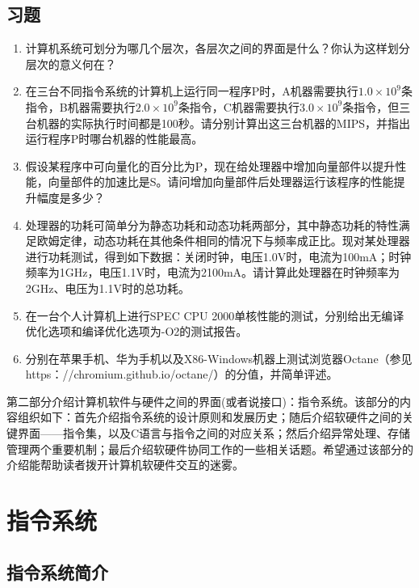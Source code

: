 \documentclass[]{ctexbook}
\begin{document}
\hypertarget{ux4e60ux9898}{%
\section{习题}\label{ux4e60ux9898}}

\begin{enumerate}
\def\labelenumi{\arabic{enumi}.}
\item
  计算机系统可划分为哪几个层次，各层次之间的界面是什么？你认为这样划分层次的意义何在？
\item
  在三台不同指令系统的计算机上运行同一程序P时，A机器需要执行\(1.0\times{}10^9\)条指令，B机器需要执行\(2.0\times{}10^9\)条指令，C机器需要执行\(3.0\times{}10^9\)条指令，但三台机器的实际执行时间都是100秒。请分别计算出这三台机器的MIPS，并指出运行程序P时哪台机器的性能最高。
\item
  假设某程序中可向量化的百分比为P，现在给处理器中增加向量部件以提升性能，向量部件的加速比是S。请问增加向量部件后处理器运行该程序的性能提升幅度是多少？
\item
  处理器的功耗可简单分为静态功耗和动态功耗两部分，其中静态功耗的特性满足欧姆定律，动态功耗在其他条件相同的情况下与频率成正比。现对某处理器进行功耗测试，得到如下数据：关闭时钟，电压1.0V时，电流为100mA；时钟频率为1GHz，电压1.1V时，电流为2100mA。请计算此处理器在时钟频率为2GHz、电压为1.1V时的总功耗。
\item
  在一台个人计算机上进行SPEC CPU 2000单核性能的测试，分别给出无编译优化选项和编译优化选项为-O2的测试报告。
\item
  分别在苹果手机、华为手机以及X86-Windows机器上测试浏览器Octane（参见https：//chromium.github.io/octane/）的分值，并简单评述。
\end{enumerate}

\newpage

第二部分介绍计算机软件与硬件之间的界面(或者说接口)：指令系统。该部分的内容组织如下：首先介绍指令系统的设计原则和发展历史；随后介绍软硬件之间的关键界面------指令集，以及C语言与指令之间的对应关系；然后介绍异常处理、存储管理两个重要机制；最后介绍软硬件协同工作的一些相关话题。希望通过该部分的介绍能帮助读者拨开计算机软硬件交互的迷雾。

\hypertarget{sec-ISA}{%
\chapter{指令系统}\label{sec-ISA}}

\hypertarget{ux6307ux4ee4ux7cfbux7edfux7b80ux4ecb}{%
\section{指令系统简介}\label{ux6307ux4ee4ux7cfbux7edfux7b80ux4ecb}}
\end{document}
